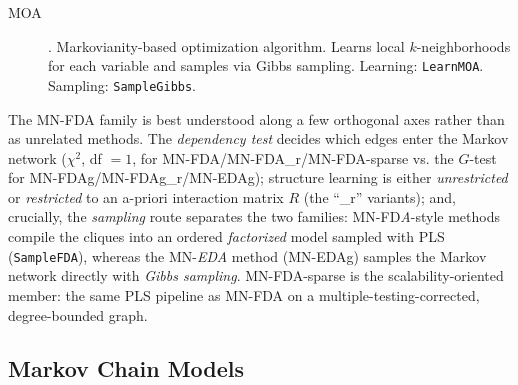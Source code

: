 \documentclass[a4paper,11pt]{article}
\begin{document}
\begin{description}
  \item[MOA] \citep{Shakya_and_McCall:2007,Shakya_and_Santana:2008}.
    Markovianity-based optimization algorithm.  Learns local $k$-neighborhoods for each variable and samples via Gibbs sampling.
    Learning: \texttt{LearnMOA}. Sampling: \texttt{SampleGibbs}.
\end{description}

The MN-FDA family is best understood along a few orthogonal axes rather than as
unrelated methods. The \emph{dependency test} decides which edges enter the
Markov network ($\chi^2$, df $=1$, for MN-FDA/MN-FDA\_r/MN-FDA-sparse vs. the
$G$-test for MN-FDAg/MN-FDAg\_r/MN-EDAg); structure learning is either
\emph{unrestricted} or \emph{restricted} to an a-priori interaction matrix $R$
(the ``\_r'' variants); and, crucially, the \emph{sampling} route separates the
two families: MN-FD\emph{A}-style methods compile the cliques into an ordered
\emph{factorized} model sampled with PLS (\texttt{SampleFDA}), whereas the
MN-\emph{EDA} method (MN-EDAg) samples the Markov network directly with
\emph{Gibbs sampling}. MN-FDA-sparse is the scalability-oriented member: the same
PLS pipeline as MN-FDA on a multiple-testing-corrected, degree-bounded graph.

\subsection{Markov Chain Models}
\label{sec:markov_chain}
\end{document}
